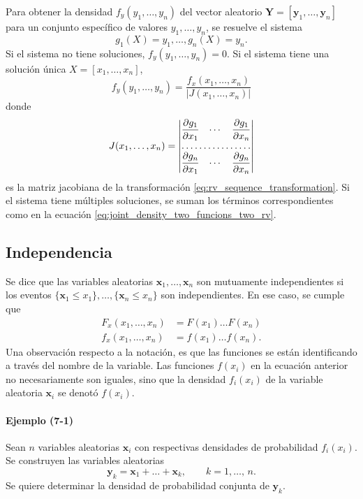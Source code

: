 \documentclass[a4paper]{report}
\newcommand{\Y}{\mathbf{Y}}
\newcommand{\x}{\mathbf{x}}
\newcommand{\y}{\mathbf{y}}
\begin{document}
Para obtener la densidad \(f_y(y_1,\dots,y_n)\) del vector aleatorio \(\Y=[\y_1,\dots,\y_n]\) para un conjunto específico de valores \(y_1,\dots,y_n\), se resuelve el sistema
\begin{equation}\label{eq:rv_sequence_transformation}
 g_1(X)=y_1,\dots,g_n(X)=y_n.
\end{equation}
Si el sistema no tiene soluciones, \(f_y(y_1,\dots,y_n)=0\). Si el sistema tiene una solución única \(X=[x_1,\dots,x_n]\),
\begin{equation}\label{eq:rv_sequence_transformation_density}
 f_y(y_1,\dots,y_n)=\frac{f_x(x_1,\dots,x_n)}{|J(x_1,\dots,x_n)|}
\end{equation}
donde
\[
 J(x_1,\dots,x_n)=
 \begin{vmatrix}
    \dfrac{\partial g_1}{\partial x_1} & \cdots & \dfrac{\partial g_1}{\partial x_n} \\
    \hdotsfor{3} \\
    \dfrac{\partial g_n}{\partial x_1} & \cdots & \dfrac{\partial g_n}{\partial x_n}
\end{vmatrix}
\]
es la matriz jacobiana de la transformación \ref{eq:rv_sequence_transformation}. Si el sistema tiene múltiples soluciones, se suman los términos correspondientes como en la ecuación \ref{eq:joint_density_two_funcions_two_rv}.

\subsection{Independencia}

Se dice que las variables aleatorias \(\x_1,\dots,\x_n\) son mutuamente independientes si los eventos \(\{\x_1\leq x_1\},\dots,\{\x_n\leq x_n\}\) son independientes. En ese caso, se cumple que
\begin{align*}
  F_x(x_1,\dots,x_n)&=F(x_1)\dots F(x_n)\\
  f_x(x_1,\dots,x_n)&=f(x_1)\dots f(x_n).
\end{align*}
Una observación respecto a la notación, es que las funciones se están identificando a través del nombre de la variable. Las funciones \(f(x_i)\) en la ecuación anterior no necesariamente son iguales, sino que la densidad \(f_i(x_i)\) de la variable aleatoria \(\x_i\) se denotó \(f(x_i)\).  

\paragraph{Ejemplo (7-1)} Sean \(n\) variables aleatorias \(\x_i\) con respectivas densidades de probabilidad \(f_i(x_i)\). Se construyen las variables aleatorias
\[
 \y_k=\x_1+\dots+\x_k,\qquad k=1,\dots,\,n.
\]
Se quiere determinar la densidad de probabilidad conjunta de \(\y_k\).
\end{document}
